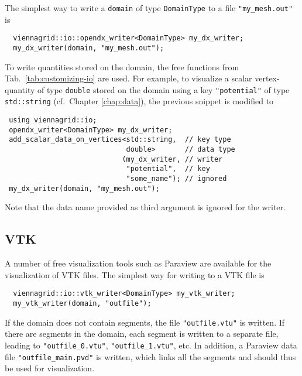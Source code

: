  The simplest way to write a \lstinline|domain| of type \lstinline|DomainType| to a file \lstinline|"my_mesh.out"| is
 \begin{lstlisting}
  viennagrid::io::opendx_writer<DomainType> my_dx_writer;
  my_dx_writer(domain, "my_mesh.out");
 \end{lstlisting}
 To write quantities stored on the domain, the free functions from Tab.~\ref{tab:customizing-io} are used.
 For example, to visualize a scalar vertex-quantity of type \lstinline|double| stored on the domain using a key \lstinline|"potential"| of type \lstinline|std::string| (cf.~Chapter \ref{chap:data}), the previous snippet is modified to
 \begin{lstlisting}
 using viennagrid::io;
 opendx_writer<DomainType> my_dx_writer;
 add_scalar_data_on_vertices<std::string,  // key type
                             double>       // data type
                            (my_dx_writer, // writer
                             "potential",  // key
                             "some_name"); // ignored
 my_dx_writer(domain, "my_mesh.out");
 \end{lstlisting}
 Note that the data name provided as third argument is ignored for the {\OpenDX} writer.


 \subsection{VTK}
 A number of free visualization tools such as Paraview \cite{paraview} are available for the visualization of VTK files.
 The simplest way for writing to a VTK file is 
 \begin{lstlisting}
  viennagrid::io::vtk_writer<DomainType> my_vtk_writer;
  my_vtk_writer(domain, "outfile");
 \end{lstlisting}
 If the domain does not contain segments, the file \lstinline|"outfile.vtu"| is written. If there are segments in the domain,
 each segment is written to a separate file, leading to \lstinline|"outfile_0.vtu"|, \lstinline|"outfile_1.vtu"|, etc. In addition,
 a Paraview data file \lstinline|"outfile_main.pvd"| is written, which links all the segments and should thus be used for visualization.

